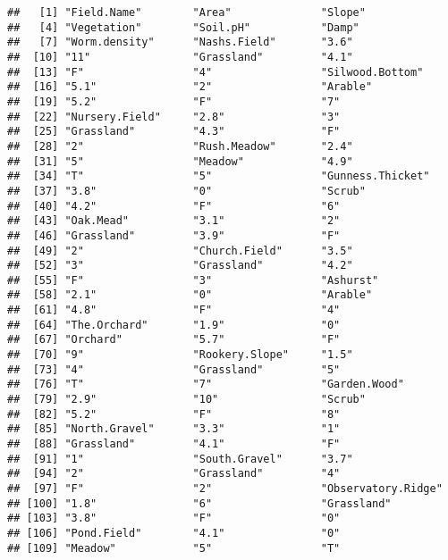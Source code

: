 \documentclass[]{article}
\begin{document}
\begin{verbatim}
##   [1] "Field.Name"        "Area"              "Slope"            
##   [4] "Vegetation"        "Soil.pH"           "Damp"             
##   [7] "Worm.density"      "Nashs.Field"       "3.6"              
##  [10] "11"                "Grassland"         "4.1"              
##  [13] "F"                 "4"                 "Silwood.Bottom"   
##  [16] "5.1"               "2"                 "Arable"           
##  [19] "5.2"               "F"                 "7"                
##  [22] "Nursery.Field"     "2.8"               "3"                
##  [25] "Grassland"         "4.3"               "F"                
##  [28] "2"                 "Rush.Meadow"       "2.4"              
##  [31] "5"                 "Meadow"            "4.9"              
##  [34] "T"                 "5"                 "Gunness.Thicket"  
##  [37] "3.8"               "0"                 "Scrub"            
##  [40] "4.2"               "F"                 "6"                
##  [43] "Oak.Mead"          "3.1"               "2"                
##  [46] "Grassland"         "3.9"               "F"                
##  [49] "2"                 "Church.Field"      "3.5"              
##  [52] "3"                 "Grassland"         "4.2"              
##  [55] "F"                 "3"                 "Ashurst"          
##  [58] "2.1"               "0"                 "Arable"           
##  [61] "4.8"               "F"                 "4"                
##  [64] "The.Orchard"       "1.9"               "0"                
##  [67] "Orchard"           "5.7"               "F"                
##  [70] "9"                 "Rookery.Slope"     "1.5"              
##  [73] "4"                 "Grassland"         "5"                
##  [76] "T"                 "7"                 "Garden.Wood"      
##  [79] "2.9"               "10"                "Scrub"            
##  [82] "5.2"               "F"                 "8"                
##  [85] "North.Gravel"      "3.3"               "1"                
##  [88] "Grassland"         "4.1"               "F"                
##  [91] "1"                 "South.Gravel"      "3.7"              
##  [94] "2"                 "Grassland"         "4"                
##  [97] "F"                 "2"                 "Observatory.Ridge"
## [100] "1.8"               "6"                 "Grassland"        
## [103] "3.8"               "F"                 "0"                
## [106] "Pond.Field"        "4.1"               "0"                
## [109] "Meadow"            "5"                 "T"                

\end{verbatim}
\end{document}
